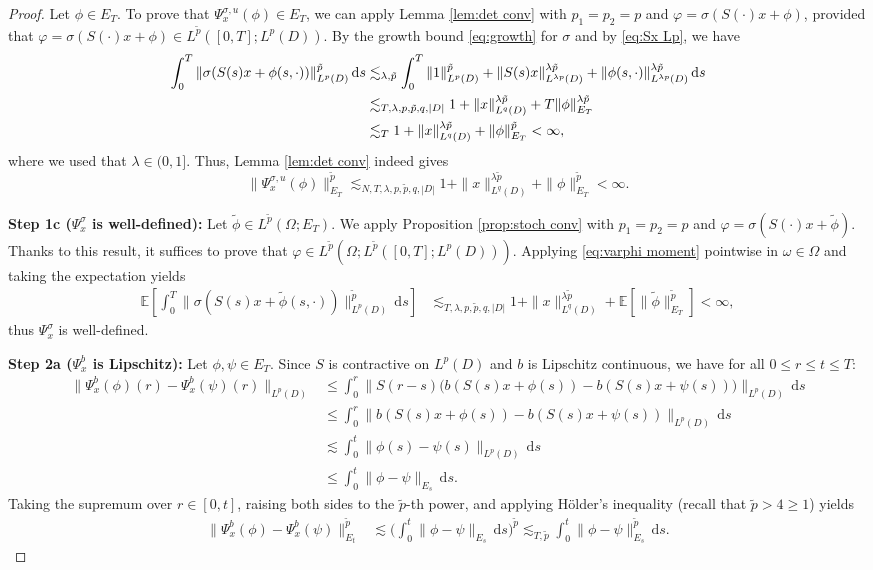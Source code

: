 \documentclass{amsart}
\theoremstyle{plain}
\theoremstyle{remark}
\theoremstyle{plain}
\numberwithin{equation}{section}
\newcommand{\E}{{\mathbb E}}
\newcommand{\Om}{\Omega}
\newcommand{\om}{\omega}
\newcommand{\dd}{\,\mathrm{d}}
\begin{document}
\begin{proof}
Let $\phi\in E_T$. To prove that $\Psi_x^{\sigma,u}(\phi)\in E_T$, we can apply Lemma \ref{lem:det conv}  with $p_1=p_2=p$ and $\varphi=\sigma(S(\cdot)x+\phi)$, provided that $\varphi =\sigma(S(\cdot)x+\phi)\in  L^{\tilde p}( [0,T];L^p(D))$. By the growth bound \eqref{eq:growth} for $\sigma$ and by \eqref{eq:Sx Lp}, we have
\begin{align}\label{eq:varphi moment} 
\int_0^T \|\sigma(S(s)x+\phi(s,\cdot))\|_{L^p(D)}^{\tilde p}\dd s
&\lesssim_{\lambda,\tilde p} \int_0^T \|1\|_{L^p(D)}^{\tilde p}+ \|S(s)x\|_{L^{\lambda p}(D)}^{\lambda \tilde p}+ \|\phi(s,\cdot)\|_{L^{\lambda p}(D)}^{\lambda \tilde p}\dd s\notag\\
&\lesssim_{T,\lambda,p,\tilde p,q,|D|} 1+\|x\|_{L^q(D)}^{\lambda\tilde p}+T\|\phi \|_{E_T}^{\lambda \tilde p}\notag\\
&\lesssim_T 1+\|x\|_{L^q(D)}^{\lambda\tilde p}+\|\phi \|_{E_T}^{\tilde p}<\infty,  
\end{align}
where we used that $\lambda\in(0,1]$. 
Thus, Lemma \ref{lem:det conv} indeed gives  
\[
\|\Psi_x^{\sigma,u}(\phi)\|_{E_T}^{\tilde p}\lesssim_{N,T,\lambda,p,\tilde p,q,|D|} 1+\|x\|_{L^q(D)}^{\lambda\tilde p}+\|\phi \|_{E_T}^{\tilde p} <\infty. 
\]

\textbf{Step 1c ($\Psi_x^\sigma$ is well-defined):} 
Let $\tilde\phi\in L^{\tilde p}(\Om;E_T)$. 
We apply Proposition \ref{prop:stoch conv}  with $p_1=p_2=p$ and    $\varphi=\sigma(S(\cdot)x+\tilde\phi)$. Thanks to this result, it suffices to prove that $\varphi\in L^{\tilde p}(\Om;L^{\tilde p}( [0,T];L^p(D)))$. 
Applying \eqref{eq:varphi moment} pointwise in $\om\in\Om$ and taking the expectation yields 
\begin{align}\label{eq:varphi moment 2}
\E[\int_0^T \|\sigma(S(s)x+\tilde\phi(s,\cdot))\|_{L^p(D)}^{\tilde p}\dd s]
&\lesssim_{T,\lambda,p,\tilde p,q,|D|}   1+\|x\|_{L^q(D)}^{\lambda\tilde p}+ \E[\|\tilde\phi \|_{E_T}^{\tilde p}]
<\infty,  
\end{align} 
thus $\Psi_x^\sigma$ is well-defined.   

\textbf{Step 2a ($\Psi_x^b$ is Lipschitz):}
Let $\phi,\psi\in E_T$. 
Since $S$ is contractive  on $L^p(D)$ and $b$ is Lipschitz continuous, we have  for all $0\leq r\leq t\leq T$:
\begin{align*}
\|\Psi_x^b(\phi)(r)-\Psi_x^b(\psi)(r)\|_{L^p(D)}
&\leq \int_0^r \big\| S(r-s) \big( b(S(s)x+\phi(s))-b(S(s)x+\psi(s)) \big) \big\|_{L^p(D)} \dd s \\
&\leq \int_0^r \| b(S(s)x+\phi(s))-b(S(s)x+\psi(s)) \|_{L^p(D)} \dd s \\
&\lesssim \int_0^t \| \phi(s)-\psi(s) \|_{L^p(D)} \dd s\\
&\leq \int_0^t \| \phi-\psi \|_{E_s} \dd s.
\end{align*} 
Taking the supremum over   $r \in [0,t]$, raising both sides to the $\tilde p$-th power, and applying H\"older's inequality (recall that $\tilde p>4 \geq 1$) yields
\begin{align*}
\|\Psi_x^b(\phi)-\Psi_x^b(\psi)\|_{E_t}^{\tilde p}
&\lesssim \Big(\int_0^t \| \phi-\psi \|_{E_s} \dd s\Big)^{\tilde p}\lesssim_{T,\tilde p}\int_0^t \| \phi-\psi \|_{E_s}^{\tilde p} \dd s.
\end{align*}



\end{proof}
\end{document}
